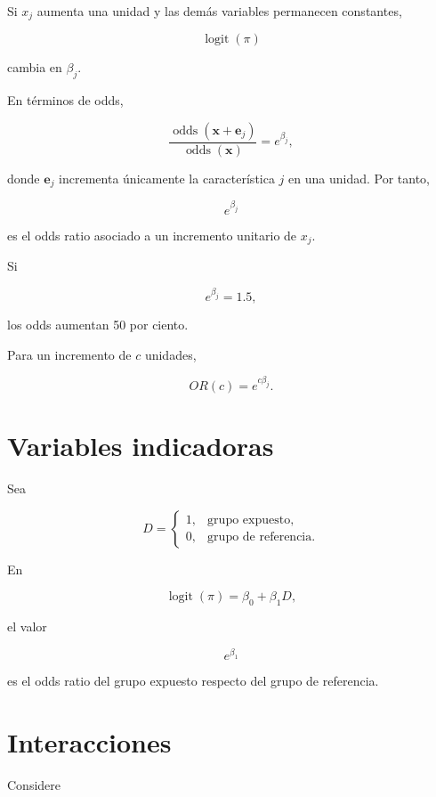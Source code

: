 \documentclass[
  spanish,
  10.5pt,
  letterpaper,
  DIV=11,
  numbers=noendperiod,
  oneside,
  open=any]{scrreprt}
\theoremstyle{definition}
\theoremstyle{definition}
\theoremstyle{plain}
\theoremstyle{remark}
\begin{document}

Si \(x_j\) aumenta una unidad y las demás variables permanecen
constantes,

\[
\operatorname{logit}(\pi)
\]

cambia en \(\beta_j\).

En términos de odds,

\[
\frac{
\operatorname{odds}(\mathbf{x}+\mathbf{e}_j)
}{
\operatorname{odds}(\mathbf{x})
}
=
e^{\beta_j},
\]

donde \(\mathbf{e}_j\) incrementa únicamente la característica \(j\) en
una unidad. Por tanto,

\[
e^{\beta_j}
\]

es el odds ratio asociado a un incremento unitario de \(x_j\).

Si

\[
e^{\beta_j}=1.5,
\]

los odds aumentan 50 por ciento.

Para un incremento de \(c\) unidades,

\[
OR(c)=e^{c\beta_j}.
\]

\section*{Variables indicadoras}\label{variables-indicadoras}


Sea

\[
D=
\begin{cases}
1, & \text{grupo expuesto},\\
0, & \text{grupo de referencia}.
\end{cases}
\]

En

\[
\operatorname{logit}(\pi)
=
\beta_0+\beta_1D,
\]

el valor

\[
e^{\beta_1}
\]

es el odds ratio del grupo expuesto respecto del grupo de referencia.

\section*{Interacciones}\label{interacciones-1}


Considere
\end{document}
